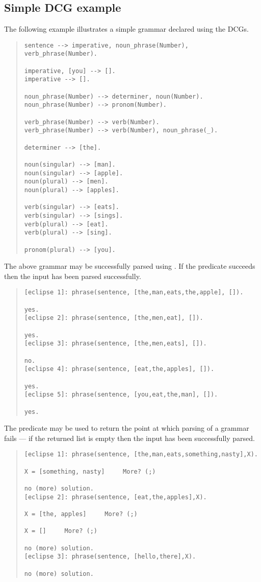\subsection{Simple DCG example}

The following example illustrates a simple grammar declared using the DCGs.

\begin{quote}
\begin{verbatim}
sentence --> imperative, noun_phrase(Number), verb_phrase(Number).

imperative, [you] --> [].
imperative --> [].

noun_phrase(Number) --> determiner, noun(Number).
noun_phrase(Number) --> pronom(Number).

verb_phrase(Number) --> verb(Number).
verb_phrase(Number) --> verb(Number), noun_phrase(_).

determiner --> [the].

noun(singular) --> [man].
noun(singular) --> [apple].
noun(plural) --> [men].
noun(plural) --> [apples].

verb(singular) --> [eats].
verb(singular) --> [sings].
verb(plural) --> [eat].
verb(plural) --> [sing].

pronom(plural) --> [you].
\end{verbatim}
\end{quote}
The above grammar may be successfully parsed
using . If the predicate
succeeds then the input has been parsed successfully.
\begin{quote}
\begin{verbatim}
[eclipse 1]: phrase(sentence, [the,man,eats,the,apple], []).

yes.
[eclipse 2]: phrase(sentence, [the,men,eat], []).

yes.
[eclipse 3]: phrase(sentence, [the,men,eats], []).

no.
[eclipse 4]: phrase(sentence, [eat,the,apples], []).

yes.
[eclipse 5]: phrase(sentence, [you,eat,the,man], []). 

yes.
\end{verbatim}
\end{quote}
The predicate  may be used to return the point at which
parsing of a grammar fails --- if the returned list is empty then the
input has been successfully parsed.

\begin{quote}
\begin{verbatim}
[eclipse 1]: phrase(sentence, [the,man,eats,something,nasty],X).

X = [something, nasty]     More? (;) 

no (more) solution.
[eclipse 2]: phrase(sentence, [eat,the,apples],X).

X = [the, apples]     More? (;) 

X = []     More? (;) 

no (more) solution.
[eclipse 3]: phrase(sentence, [hello,there],X).

no (more) solution.
\end{verbatim}
\end{quote}

